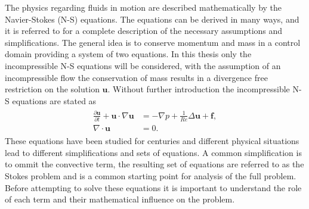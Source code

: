 The physics regarding fluids in motion are described mathematically by the Navier-Stokes (N-S) equations. 
The equations can be derived in many ways, and it is referred to \cite{White} for a complete 
description of the necessary assumptions and simplifications.
The general idea is to conserve momentum and mass in a control domain providing a system of two equations.
In this thesis only the incompressible N-S equations will be considered, 
with the assumption of an incompressible flow the conservation of mass 
results in a divergence free restriction on the solution $\mathbf{u}$.
Without further introduction the incompressible N-S equations are stated as  
%
\begin{align}
    \begin{split}
    \frac{\partial \mathbf{u}}{\partial t} + \mathbf{u}\cdot \nabla\mathbf{u} &= 
    -\nabla p + \frac{1}{Re} \Delta\mathbf{u} + \mathbf{f}, \\
		\nabla \cdot \mathbf{u} &= 0.
    \end{split}
	\label{eq:NS}
\end{align}
%
These equations have been studied for centuries and different physical situations
lead to different simplifications and sets of equations.
A common simplification is to ommit the convective term, the resulting set of equations are referred to as the Stokes problem
and is a common starting point for analysis of the full problem.
Before attempting to solve these equations it is important to understand the role of each term 
and their mathematical influence on the problem. 
